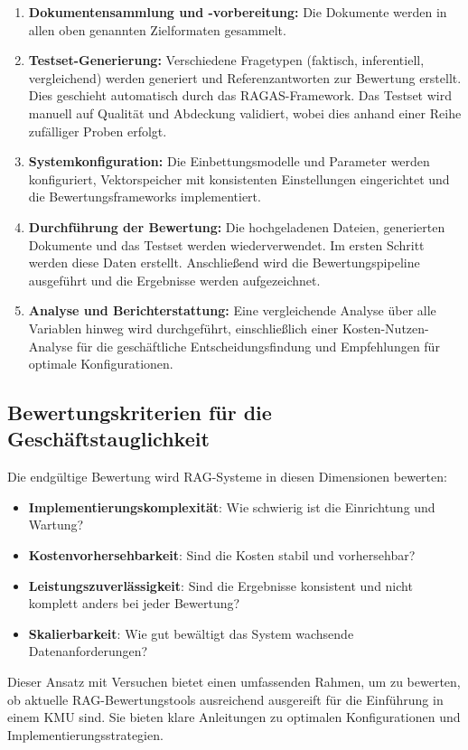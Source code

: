 \begin{enumerate}
    \item \textbf{Dokumentensammlung und -vorbereitung:}
    Die Dokumente werden in allen oben genannten Zielformaten gesammelt.

    \item \textbf{Testset-Generierung:}
    Verschiedene Fragetypen (faktisch, inferentiell, vergleichend) werden generiert und Referenzantworten zur Bewertung erstellt.
    Dies geschieht automatisch durch das RAGAS-Framework.
    Das Testset wird manuell auf Qualität und Abdeckung validiert, wobei dies anhand einer Reihe zufälliger Proben erfolgt.

    \item \textbf{Systemkonfiguration:}
    Die Einbettungsmodelle und Parameter werden konfiguriert, Vektorspeicher mit konsistenten Einstellungen eingerichtet und die Bewertungsframeworks implementiert.

    \item \textbf{Durchführung der Bewertung:}
    Die hochgeladenen Dateien, generierten Dokumente und das Testset werden wiederverwendet. Im ersten Schritt werden diese Daten erstellt.
    Anschließend wird die Bewertungspipeline ausgeführt und die Ergebnisse werden aufgezeichnet.

    \item \textbf{Analyse und Berichterstattung:}
    Eine vergleichende Analyse über alle Variablen hinweg wird durchgeführt, einschließlich einer Kosten-Nutzen-Analyse für die geschäftliche Entscheidungsfindung und Empfehlungen für optimale Konfigurationen.
\end{enumerate}

\subsection{Bewertungskriterien für die Geschäftstauglichkeit}

Die endgültige Bewertung wird RAG-Systeme in diesen Dimensionen bewerten:
\begin{itemize}
    \item \textbf{Implementierungskomplexität}: Wie schwierig ist die Einrichtung und Wartung?
    \item \textbf{Kostenvorhersehbarkeit}: Sind die Kosten stabil und vorhersehbar?
    \item \textbf{Leistungszuverlässigkeit}: Sind die Ergebnisse konsistent und nicht komplett anders bei jeder Bewertung?
    \item \textbf{Skalierbarkeit}: Wie gut bewältigt das System wachsende Datenanforderungen?
\end{itemize}

Dieser Ansatz mit Versuchen bietet einen umfassenden Rahmen, um zu bewerten, ob aktuelle RAG-Bewertungstools ausreichend ausgereift für die Einführung in einem KMU sind. Sie bieten klare Anleitungen zu optimalen Konfigurationen und Implementierungsstrategien.